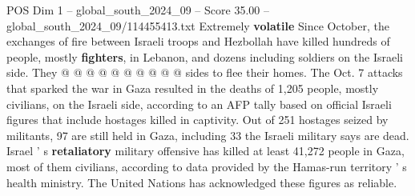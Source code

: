 \begin{textsample}{POS Dim 1 – global\_south\_2024\_09 – Score 35.00 – global\_south\_2024\_09/114455413.txt}
Extremely \textbf{volatile} Since October, the exchanges of fire between Israeli troops and Hezbollah have killed hundreds of people, mostly \textbf{fighters}, in Lebanon, and dozens including soldiers on the Israeli side.
They @ @ @ @ @ @ @ @ @ @ sides to flee their homes.
The Oct. 7 attacks that sparked the war in Gaza resulted in the deaths of 1,205 people, mostly civilians, on the Israeli side, according to an AFP tally based on official Israeli figures that include hostages killed in captivity.
Out of 251 hostages seized by militants, 97 are still held in Gaza, including 33 the Israeli military says are dead.
Israel ' s \textbf{retaliatory} military offensive has killed at least 41,272 people in Gaza, most of them civilians, according to data provided by the Hamas-run territory ' s health ministry.
The United Nations has acknowledged these figures as reliable.

\end{textsample}
